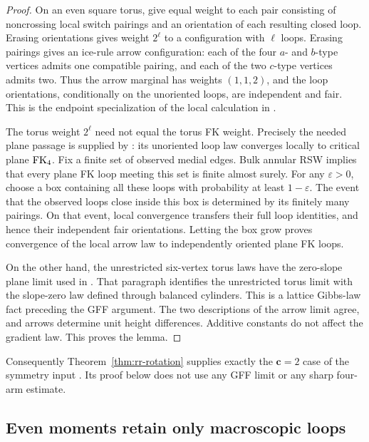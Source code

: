 \begin{proof}
On an even square torus, give equal weight to each pair consisting
of noncrossing local switch pairings and an orientation of each
resulting closed loop.  Erasing orientations gives weight $2^\ell$
to a configuration with $\ell$ loops.  Erasing pairings gives an
ice-rule arrow configuration: each of the four $a$- and $b$-type
vertices admits one compatible pairing, and each of the two
$c$-type vertices admits two.  Thus the arrow marginal has weights
$(1,1,2)$, and the loop orientations, conditionally on the
unoriented loops, are independent and fair.  This is the endpoint
specialization of the local calculation in
\cite[Section~2, Equations~(2.1)--(2.3)]{Lis2021}.

The torus weight $2^\ell$ need not equal the torus FK weight.
Precisely the needed plane passage is supplied by
\cite[Lemma~3.1]{Lis2021}: its unoriented loop law converges locally
to critical plane $\operatorname{FK}_4$.  Fix a finite set of observed medial
edges.  Bulk annular RSW implies that every plane FK loop meeting
this set is finite almost surely.  For any $\varepsilon>0$, choose
a box containing all these loops with probability at least
$1-\varepsilon$.  The event that the observed loops close inside
this box is determined by its finitely many pairings.  On that
event, local convergence transfers their full loop identities,
and hence their independent fair orientations.  Letting the box
grow proves convergence of the local arrow law to independently
oriented plane FK loops.

On the other hand, the unrestricted six-vertex torus laws have the
zero-slope plane limit used in
\cite[Theorem~2.2 and the paragraph following it]{SixVertexGFF2026}.
That paragraph identifies the unrestricted torus limit with the
slope-zero law defined through balanced cylinders.  This is a
lattice Gibbs-law fact preceding the GFF
argument.  The two descriptions of the arrow limit agree, and
arrows determine unit height differences.  Additive constants do
not affect the gradient law.  This proves the lemma.
\end{proof}

Consequently Theorem~\ref{thm:rr-rotation} supplies exactly the
$\mathbf c=2$ case of the symmetry input
\cite[Theorem~4.1]{SixVertexGFF2026}.  Its proof below does not use
any GFF limit or any sharp four-arm estimate.

\subsection{Even moments retain only macroscopic loops}

